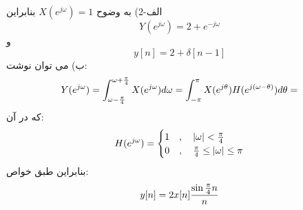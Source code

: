 \documentclass[10pt,letterpaper]{article}
\begin{document}
الف-2) به وضوح
$
X(e^{j\omega})=1
$
 بنابراین
$$
Y(e^{j\omega})=2+e^{-j\omega}
$$
و
$$
y[n]=2+\delta[n-1]
$$
ب) می توان نوشت:
$$
Y(e^{j\omega})=\int_{\omega-{\pi\over 4}}^{\omega+{\pi\over 4}}X(e^{j\omega})d\omega=\int_{-\pi}^{\pi}X(e^{j\theta})H(e^{j(\omega-\theta)})d\theta=
$$
که در آن:
$$
H(e^{j\omega})=\begin{cases}
1&,\quad |\omega|<{\pi\over 4}\\
0&,\quad {\pi\over 4}\le|\omega|\le \pi
\end{cases}
$$
بنابراین طبق خواص:
$$
y[n]=2 x[n]{\sin{\pi\over 4}n\over n}
$$
\end{document}
